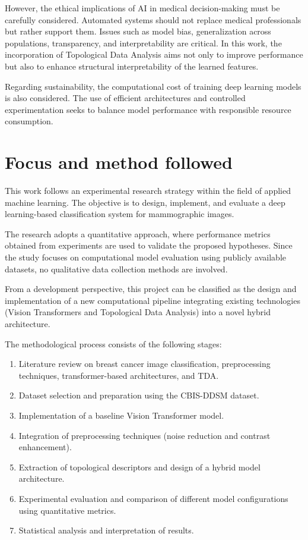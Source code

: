 \documentclass[ENG]{TFUOC}%
\begin{document}
However, the ethical implications of AI in medical decision-making must be carefully considered. Automated systems should not replace medical professionals but rather support them. Issues such as model bias, generalization across populations, transparency, and interpretability are critical. In this work, the incorporation of Topological Data Analysis aims not only to improve performance but also to enhance structural interpretability of the learned features.

Regarding sustainability, the computational cost of training deep learning models is also considered. The use of efficient architectures and controlled experimentation seeks to balance model performance with responsible resource consumption.

\section{Focus and method followed}

This work follows an experimental research strategy within the field of applied machine learning. The objective is to design, implement, and evaluate a deep learning-based classification system for mammographic images.

The research adopts a quantitative approach, where performance metrics obtained from experiments are used to validate the proposed hypotheses. Since the study focuses on computational model evaluation using publicly available datasets, no qualitative data collection methods are involved.

From a development perspective, this project can be classified as the design and implementation of a new computational pipeline integrating existing technologies (Vision Transformers and Topological Data Analysis) into a novel hybrid architecture.

The methodological process consists of the following stages:

\begin{enumerate}
    \sloppy \item Literature review on breast cancer image classification, preprocessing techniques, transformer-based architectures, and TDA.
    
    \item Dataset selection and preparation using the CBIS-DDSM dataset.
    
    \item Implementation of a baseline Vision Transformer model.
    
    \item Integration of preprocessing techniques (noise reduction and contrast enhancement).
    
    \item Extraction of topological descriptors and design of a hybrid model architecture.
    
    \item Experimental evaluation and comparison of different model configurations using quantitative metrics.
    
    \item Statistical analysis and interpretation of results.
\end{enumerate}
\end{document}

